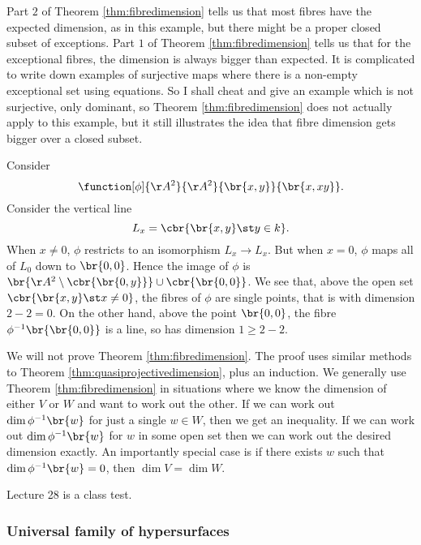 Part $ 2 $ of Theorem \ref{thm:fibredimension} tells us that most fibres have the expected dimension, as in this example, but there might be a proper closed subset of exceptions. Part $ 1 $ of Theorem \ref{thm:fibredimension} tells us that for the exceptional fibres, the dimension is always bigger than expected. It is complicated to write down examples of surjective maps where there is a non-empty exceptional set using equations. So I shall cheat and give an example which is not surjective, only dominant, so Theorem \ref{thm:fibredimension} does not actually apply to this example, but it still illustrates the idea that fibre dimension gets bigger over a closed subset.

\begin{example*}
Consider
$$ \function[\phi]{\AA^2}{\AA^2}{\br{x, y}}{\br{x, xy}}. $$
Consider the vertical line
$$ L_x = \cbr{\br{x, y} \st y \in k}. $$
When $ x \ne 0 $, $ \phi $ restricts to an isomorphism $ L_x \to L_x $. But when $ x = 0 $, $ \phi $ maps all of $ L_0 $ down to $ \br{0, 0} $. Hence the image of $ \phi $ is $ \br{\AA^2 \setminus \cbr{\br{0, y}}} \cup \cbr{\br{0, 0}} $. We see that, above the open set $ \cbr{\br{x, y} \st x \ne 0} $, the fibres of $ \phi $ are single points, that is with dimension $ 2 - 2 = 0 $. On the other hand, above the point $ \br{0, 0} $, the fibre $ \phi^{-1}\br{\br{0, 0}} $ is a line, so has dimension $ 1 \ge 2 - 2 $.
\end{example*}

We will not prove Theorem \ref{thm:fibredimension}. The proof uses similar methods to Theorem \ref{thm:quasiprojectivedimension}, plus an induction. We generally use Theorem \ref{thm:fibredimension} in situations where we know the dimension of either $ V $ or $ W $ and want to work out the other. If we can work out $ \dim \phi^{-1}\br{w} $ for just a single $ w \in W $, then we get an inequality. If we can work out $ \dim \phi^{-1}\br{w} $ for $ w $ in some open set then we can work out the desired dimension exactly. An importantly special case is if there exists $ w $ such that $ \dim \phi^{-1}\br{w} = 0 $, then $ \dim V = \dim W $.


Lecture 28 is a class test.

\subsubsection{Universal family of hypersurfaces}


